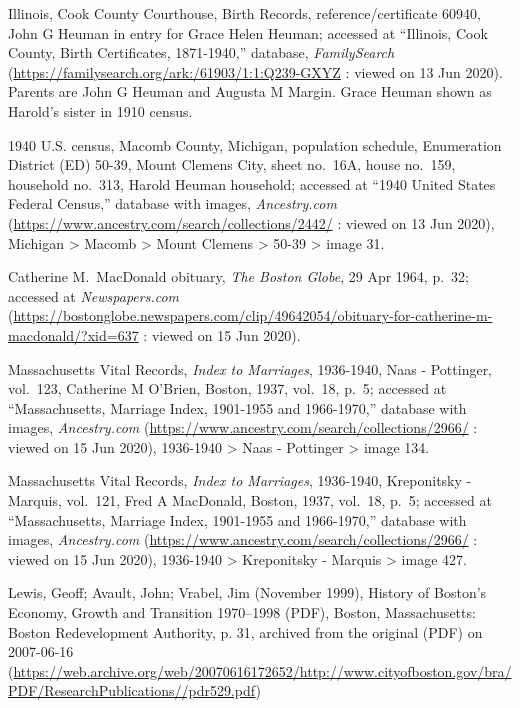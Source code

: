 \begin{thebibliography}{999}
	Illinois, Cook County Courthouse, Birth Records, reference/certificate 60940, John G Heuman in entry for Grace Helen Heuman; accessed at ``Illinois, Cook County, Birth Certificates, 1871-1940,'' database, \textit{FamilySearch} (\url{https://familysearch.org/ark:/61903/1:1:Q239-GXYZ} : viewed on 13 Jun 2020).\\
	Parents are John G Heuman and Augusta M Margin. Grace Heuman shown as Harold's sister in 1910 census.
	
	1940 U.S. census, Macomb County, Michigan, population schedule, Enumeration District (ED) 50-39, Mount Clemens City, sheet no.\ 16A, house no.\ 159, household no.\ 313, Harold Heuman household; accessed at ``1940 United States Federal Census,'' database with images, \textit{Ancestry.com} (\url{https://www.ancestry.com/search/collections/2442/} : viewed on 13 Jun 2020), Michigan > Macomb > Mount Clemens > 50-39 > image 31.
	
	Catherine M.\ MacDonald obituary, \textit{The Boston Globe}, 29 Apr 1964, p.\ 32; accessed at \textit{Newspapers.com} (\url{https://bostonglobe.newspapers.com/clip/49642054/obituary-for-catherine-m-macdonald/?xid=637} : viewed on 15 Jun 2020).
	
	Massachusetts Vital Records, \textit{Index to Marriages}, 1936-1940, Naas - Pottinger, vol.\ 123, Catherine M O'Brien, Boston, 1937, vol.\ 18, p.\ 5; accessed at ``Massachusetts, Marriage Index, 1901-1955 and 1966-1970,'' database with images, \textit{Ancestry.com} (\url{https://www.ancestry.com/search/collections/2966/} : viewed on 15 Jun 2020), 1936-1940 > Naas - Pottinger > image 134.
	
	Massachusetts Vital Records, \textit{Index to Marriages}, 1936-1940, Kreponitsky - Marquis, vol.\ 121, Fred A MacDonald, Boston, 1937, vol.\ 18, p.\ 5; accessed at ``Massachusetts, Marriage Index, 1901-1955 and 1966-1970,'' database with images, \textit{Ancestry.com} (\url{https://www.ancestry.com/search/collections/2966/} : viewed on 15 Jun 2020), 1936-1940 > Kreponitsky - Marquis > image 427.
	
	Lewis, Geoff; Avault, John; Vrabel, Jim (November 1999), History of Boston's Economy, Growth and Transition 1970–1998 (PDF), Boston, Massachusetts: Boston Redevelopment Authority, p. 31, archived from the original (PDF) on 2007-06-16 (\url{https://web.archive.org/web/20070616172652/http://www.cityofboston.gov/bra/PDF/ResearchPublications//pdr529.pdf})
	

\end{thebibliography}
